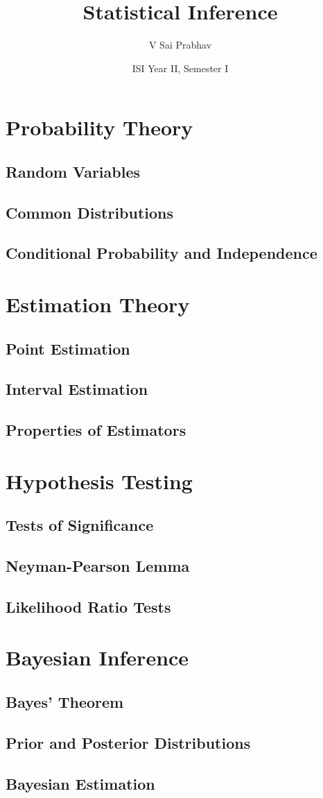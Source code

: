 \documentclass{book}
\title{Statistical Inference}
\author{V Sai Prabhav}
\date{ISI Year II, Semester I}
\begin{document}
\maketitle

\chapter{Probability Theory}
\section{Random Variables}
\section{Common Distributions}
\section{Conditional Probability and Independence}

\chapter{Estimation Theory}
\section{Point Estimation}
\section{Interval Estimation}
\section{Properties of Estimators}

\chapter{Hypothesis Testing}
\section{Tests of Significance}
\section{Neyman-Pearson Lemma}
\section{Likelihood Ratio Tests}

\chapter{Bayesian Inference}
\section{Bayes' Theorem}
\section{Prior and Posterior Distributions}
\section{Bayesian Estimation}

\printindex
\end{document}
